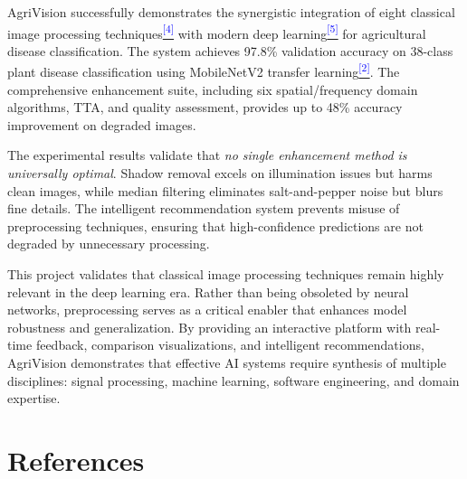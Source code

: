 \documentclass[12pt,a4paper]{article}
\newcommand{\citeref}[1]{\hyperref[ref:#1]{\textcolor{blue}{\large\textsuperscript{[#1]}}}}
\begin{document}
AgriVision successfully demonstrates the synergistic integration of eight classical image processing techniques\citeref{4} with modern deep learning\citeref{5} for agricultural disease classification. The system achieves 97.8\% validation accuracy on 38-class plant disease classification using MobileNetV2 transfer learning\citeref{2}. The comprehensive enhancement suite, including six spatial/frequency domain algorithms, TTA, and quality assessment, provides up to 48\% accuracy improvement on degraded images.

The experimental results validate that \textit{no single enhancement method is universally optimal}. Shadow removal excels on illumination issues but harms clean images, while median filtering eliminates salt-and-pepper noise but blurs fine details. The intelligent recommendation system prevents misuse of preprocessing techniques, ensuring that high-confidence predictions are not degraded by unnecessary processing.

This project validates that classical image processing techniques remain highly relevant in the deep learning era. Rather than being obsoleted by neural networks, preprocessing serves as a critical enabler that enhances model robustness and generalization. By providing an interactive platform with real-time feedback, comparison visualizations, and intelligent recommendations, AgriVision demonstrates that effective AI systems require synthesis of multiple disciplines: signal processing, machine learning, software engineering, and domain expertise.

\section*{References}
\end{document}
